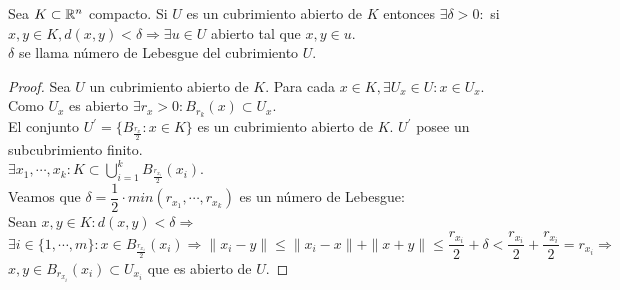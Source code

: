 \begin{prop}
  Sea $K \subset \mathbb{R}^n$ compacto. Si $U$ es un cubrimiento abierto de $K$ entonces $\exists \delta > 0 :$ si $x, y \in K, d(x, y) < \delta \Rightarrow \exists u \in U$ abierto tal que $x, y \in u$. \\
  $\delta$ se llama número de Lebesgue del cubrimiento $U$.
  \begin{proof}
    Sea $U$ un cubrimiento abierto de $K$. Para cada $x \in K, \exists U_x \in U : x \in U_x$. Como $U_x$ es abierto $\exists r_x > 0 : B_{r_k}(x) \subset U_x$. \\
    El conjunto $U^{\prime} = \{ B_{\frac{r_x}{2}} : x \in K \}$ es un cubrimiento abierto de $K$. $U^{\prime}$ posee un subcubrimiento finito. \\
    $\exists x_1, \cdots, x_k : K \subset \bigcup_{i = 1}^{k} B_{\frac{r_{x_i}}{2}}(x_i)$. \\
    Veamos que $\delta = \dfrac{1}{2} \cdot min(r_{x_1}, \cdots, r_{x_k})$ es un número de Lebesgue: \\
    Sean $x, y \in K : d(x,y) < \delta \Rightarrow$ \\
    $\exists i \in \{1, \cdots, m\} : x \in B_{\frac{r_{x_i}}{2}}(x_i) \Rightarrow \|x_i - y\| \leq \|x_i - x\| + \|x+y\| \leq \dfrac{r_{x_i}}{2} + \delta < \dfrac{r_{x_i}}{2} + \dfrac{r_{x_i}}{2} = r_{x_i} \Rightarrow$ \\
    $x, y \in B_{r_{x_i}}(x_i) \subset U_{x_i}$ que es abierto de $U$.
  \end{proof}
\end{prop}